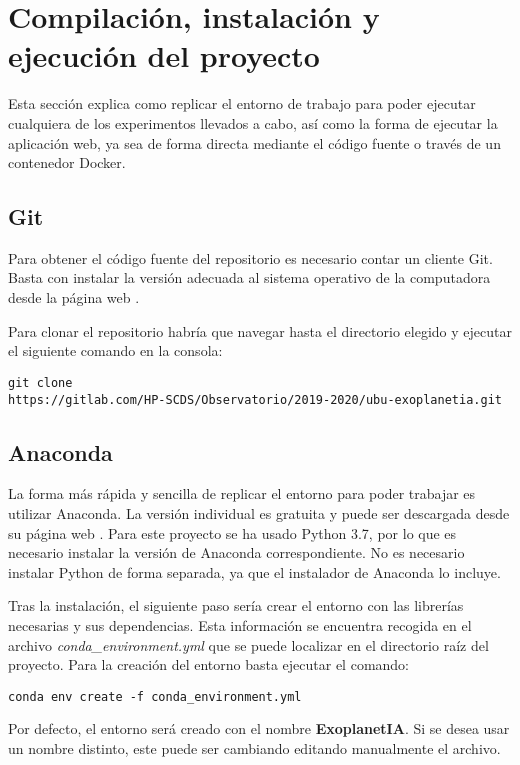 \section{Compilación, instalación y ejecución del proyecto}

Esta sección explica como replicar el entorno de trabajo para poder ejecutar cualquiera de los experimentos llevados a cabo, así como la forma de ejecutar la aplicación web, ya sea de forma directa mediante el código fuente o través de un contenedor Docker.

\subsection{Git}

Para obtener el código fuente del repositorio es necesario contar un cliente Git. Basta con instalar la versión adecuada al sistema operativo de la computadora desde la página web \cite{Git}.

Para clonar el repositorio habría que navegar hasta el directorio elegido y ejecutar el siguiente comando en la consola:

\texttt{git clone\\ https://gitlab.com/HP-SCDS/Observatorio/2019-2020/ubu-exoplanetia.git}

\subsection{Anaconda}

La forma más rápida y sencilla de replicar el entorno para poder trabajar es utilizar Anaconda. La versión individual es gratuita y puede ser descargada desde su página web \cite{Anaconda}. Para este proyecto se ha usado Python 3.7, por lo que es necesario instalar la versión de Anaconda correspondiente. No es necesario instalar Python de forma separada, ya que el instalador de Anaconda lo incluye.

Tras la instalación, el siguiente paso sería crear el entorno con las librerías necesarias y sus dependencias. Esta información se encuentra recogida en el archivo \textit{conda\_environment.yml} que se puede localizar en el directorio raíz del proyecto. Para la creación del entorno basta ejecutar el comando:

\texttt{conda env create -f conda\_environment.yml}

Por defecto, el entorno será creado con el nombre \textbf{ExoplanetIA}. Si se desea usar un nombre distinto, este puede ser cambiando editando manualmente el archivo.

